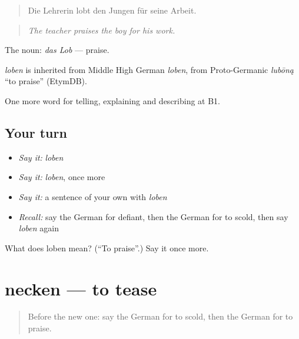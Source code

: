\begin{quote}
Die Lehrerin lobt den Jungen für seine Arbeit.
\end{quote}

\begin{quote}
\emph{The teacher praises the boy for his work.}
\end{quote}

The noun: \emph{das Lob} — praise.

\begin{cousinweb}
\emph{loben} is inherited from Middle High German \emph{loben}, from Proto-Germanic \emph{lubōną} \textquotedblleft{}to praise\textquotedblright{} (EtymDB).
\end{cousinweb}

\begin{grammarlens}[title={What you've built}]
One more word for telling, explaining and describing at B1.
\end{grammarlens}

\subsection*{Your turn}
\begin{itemize}
\raggedright
  \item \emph{Say it:} \emph{loben}
  \item \emph{Say it:} \emph{loben}, once more
  \item \emph{Say it:} a sentence of your own with \emph{loben}
  \item \emph{Recall:} say the German for defiant, then the German for to scold, then say \emph{loben} again
\end{itemize}

\begin{tcolorbox}[breakable,colback=teal!4,colframe=teal!35!black,title={Before you move on}]
What does loben mean? (\textquotedblleft{}To praise\textquotedblright{}.) Say it once more.
\end{tcolorbox}
\section[necken]{necken — to tease}

\label{lesson:GE-C497-necken}



\begin{quote}
Before the new one: say the German for to scold, then the German for to praise.
\end{quote}


